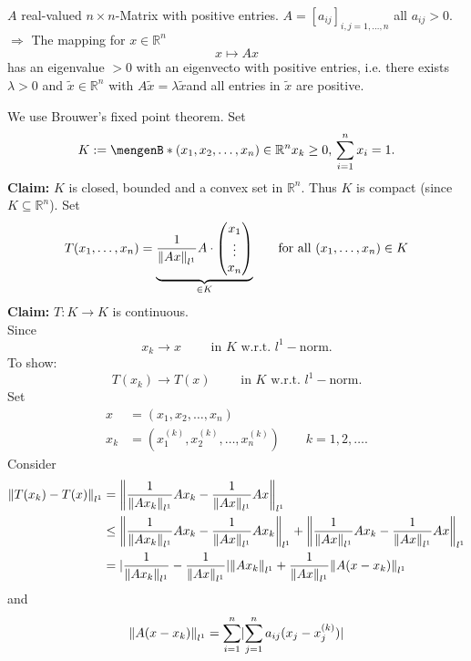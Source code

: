 \begin{theorem}
	$A$ real-valued $n \times n$-Matrix with positive entries. $A = [a_{ij}]_{i,j=1, \dots,n}$ all $a_{ij}>0$. \\
	$\Rightarrow $ The mapping for $x \in \mathbb{R}^n$ 
	\[
		x \mapsto Ax
	\]
	has an eigenvalue $>0$ with an eigenvecto with positive entries, i.e. there exists $\lambda >0$ and $\tilde x \in \mathbb{R}^n$ with $A \tilde x = \lambda \tilde x$and all entries in $\tilde x$ are positive.
\end{theorem}

\begin{beweis}
We use Brouwer's fixed point theorem. Set \[
	K := \set[(x_1,x_2,\dots,x_n) \in \mathbb{R}^n]{x_k \geq 0, \, \sum^{n}_{i=1} x_i = 1}.
\]	
\textbf{Claim:} \text{    }     $K$ is closed, bounded and a convex set in $\mathbb{R}^n$. Thus $K$ is compact (since $K \subseteq \mathbb{R}^n$). Set
\[
	T(x_1,\dots,x_n) = \underset{\in K}{\underbrace{\frac{1}{\norm{Ax}_{l^1}}A \cdot \begin{pmatrix}
		x_1 \\ \vdots \\ x_n
	\end{pmatrix}}} \qquad \text{for all }(x_1,\dots,x_n) \in K
\]
\textbf{Claim:} \text{    }     $T: K \to K$ is continuous. \\
Since
\[
	x_k \to x \qquad \text{ in } K \text{ w.r.t. }l^1-\text{norm}.
\]
To show:
\[
	T(x_k) \to T(x) \qquad \text{ in } K \text{ w.r.t. }l^1-\text{norm}.
\]
Set
\begin{align*}
	x &= (x_1,x_2, \dots,x_n) \\
	x_k &= (x_1^{(k)},x_2^{(k)}, \dots, x_n^{(k)}) \qquad k = 1,2,\dots.
\end{align*}
Consider
\begin{align*}
	\norm{T(x_k)-T(x)}_{l^1} &= \norm{ \frac{1}{\norm{Ax_k}_{l^1}} A x_k - \frac{1}{\norm{Ax}_{l^1}} A x }_{l^1} \\
	&\leq  \norm{\frac{1}{\norm{Ax_k}_{l^1}} A x_k - \frac{1}{\norm{Ax}_{l^1}} A x_k}_{l^1} + \norm{\frac{1}{\norm{Ax}_{l^1}} A x_k - \frac{1}{\norm{Ax}_{l^1}} A x}_{l^1} \\
	&= \abs{\frac{1}{\norm{Ax_k}_{l^1}} - \frac{1}{\norm{Ax}_{l^1}}} \norm{A x_k}_{l^1} + \frac{1}{\norm{Ax}_{l^1}} \norm{A(x -x_k)}_{l^1}
\end{align*}
and
\begin{align*}
	\norm{A(x-x_k)}_{l^1} &= \sum^{n}_{i=1} \abs{ \sum^{n}_{j=1} a_{ij}(x_j-x_j^{(k)})} \\

\end{align*}
\end{beweis}
